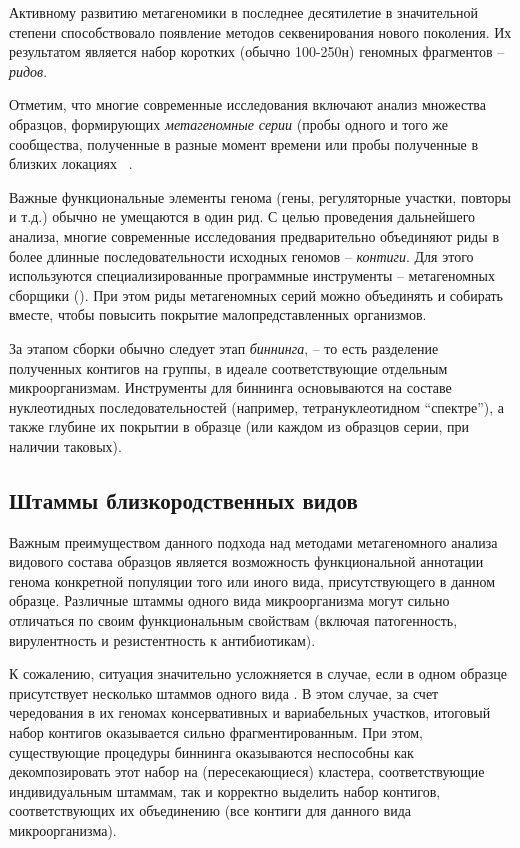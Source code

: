 \documentclass{spbau-diploma}
\begin{document}
Активному развитию метагеномики в последнее десятилетие в значительной степени способствовало появление методов секвенирования нового поколения. Их результатом является набор коротких (обычно 100-250н) геномных фрагментов -- \textit{ридов}. 

Отметим, что многие современные исследования включают анализ множества образцов, формирующих \textit{метагеномные серии} (пробы одного и того же сообщества, полученные в разные момент времени \cite{time_series} или пробы полученные в близких локациях ~\cite{spacial_series_1, spacial_series_2}.

Важные функциональные элементы генома (гены, регуляторные участки, повторы и т.д.) обычно не умещаются в один рид. 
С целью проведения дальнейшего анализа, многие современные исследования предварительно объединяют риды в более длинные последовательности исходных геномов -- \textit{контиги}. Для этого используются специализированные программные инструменты -- метагеномных сборщики (\cite{IDBA-UD, MEGAHIT, MetaVelvet, RayMeta, MetaSpades}). При этом риды метагеномных серий можно объединять и собирать вместе, чтобы повысить покрытие малопредставленных организмов. 

За этапом сборки обычно следует этап \textit{биннинга}, -- то есть разделение полученных контигов на группы, в идеале соответствующие отдельным микроорганизмам. Инструменты для биннинга \cite{CONCOCT, GroopM, MyCC, MetaBAT} основываются на составе нуклеотидных последовательностей (например, тетрануклеотидном “спектре”), а также глубине их покрытии в образце (или каждом из образцов серии, при наличии таковых). 


\subsection{Штаммы близкородственных видов}


Важным преимуществом данного подхода над методами метагеномного анализа видового состава образцов является возможность функциональной аннотации генома конкретной популяции того или иного вида, присутствующего в данном образце. Различные штаммы одного вида микроорганизма могут сильно отличаться по своим функциональным свойствам (включая патогенность, вирулентность и резистентность к антибиотикам).

К сожалению, ситуация значительно усложняется  в случае, если в одном образце присутствует несколько штаммов одного вида \cite{StrainEst, metasub, infant_gut}.
В этом случае, за счет чередования в их геномах консервативных и вариабельных участков, итоговый набор контигов оказывается сильно фрагментированным. При этом, существующие процедуры биннинга оказываются неспособны как декомпозировать этот набор на (пересекающиеся) кластера, соответствующие индивидуальным штаммам, так и корректно выделить набор контигов, соответствующих их объединению (все контиги для данного вида микроорганизма).
\end{document}
